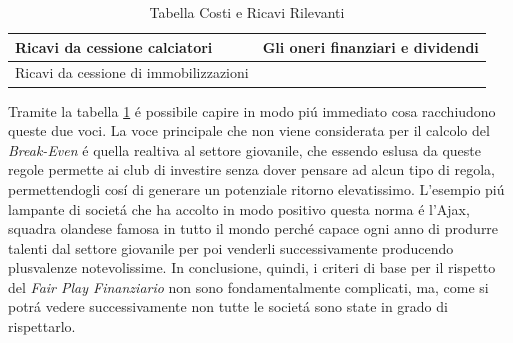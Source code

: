 \documentclass[
    corpo=12pt,
    oneside,
    evenboxes,
    tipotesi=triennale,
    stile=classica,
    oldstyle,
    autoretitolo,
    greek,
]{toptesi}
\begin{document}
\begin{interlinea}{1.5}
\begin{table}
\begin{tabularx}{\textwidth}{XX}
        \midrule
        Ricavi da cessione calciatori & Gli oneri finanziari e dividendi \\
        \midrule
        Ricavi da cessione di immobilizzazioni & \\
        \bottomrule
    \end{tabularx}
    \caption{Tabella Costi e Ricavi Rilevanti}
    \label{tabella_ric_costi_ril}
\end{table} 
Tramite la tabella \ref{tabella_ric_costi_ril} \'e possibile capire in modo pi\'u immediato cosa racchiudono queste due voci. La voce principale 
che non viene considerata per il calcolo del \emph{Break-Even} \'e quella realtiva al settore giovanile, che essendo eslusa da queste regole
permette ai club di investire senza dover pensare ad alcun tipo di regola, permettendogli cos\'i di generare un potenziale ritorno
elevatissimo. L'esempio pi\'u lampante di societ\'a che ha accolto in modo positivo questa norma \'e l'Ajax, squadra olandese famosa in 
tutto il mondo perch\'e capace ogni anno di produrre talenti dal settore giovanile per poi venderli successivamente
producendo plusvalenze notevolissime.\newline
In conclusione, quindi, i criteri di base per il rispetto del \emph{Fair Play Finanziario} non sono fondamentalmente complicati, ma, come 
si potr\'a vedere successivamente non tutte le societ\'a sono state in grado di rispettarlo.

\end{interlinea}
\end{document}
